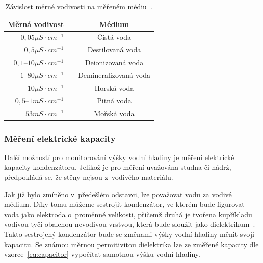             \begin{table}[h]\centering
                \begin{tabular}{@{}rcc@{}}\toprule
                    \textbf{Měrná vodivost}                 && \textbf{Médium}\\
                    \midrule
                    $0,05\unit{\mu S\cdot cm^{-1}}$         && Čistá voda\\
                    $0,5\unit{\mu S\cdot cm^{-1}}$          && Destilovaná voda\\
                    $0,1$--$10\unit{\mu S\cdot cm^{-1}}$    && Deionizovaná voda\\
                    $1$--$80\unit{\mu S\cdot cm^{-1}}$      && Demineralizovaná voda\\
                    $10\unit{\mu S\cdot cm^{-1}}$           && Horská voda\\
                    $0,5$--$1\unit{mS\cdot cm^{-1}}$        && Pitná voda\\
                    $53\unit{mS\cdot cm^{-1}}$              && Mořská voda\\
                    \bottomrule
                \end{tabular}
                \caption{Závislost měrné vodivosti na měřeném médiu~\cite{conductivity}.}
                \label{table:waters}
            \end{table}

        \subsubsection{Měření elektrické kapacity}
            \label{sec:capacitance}

            Další možností pro monitorování výšky vodní hladiny je měření elektrické kapacity kondenzátoru. Jelikož je pro měření uvažována studna či nádrž, předpokládá se, že stěny nejsou z~vodivého materiálu.

            Jak již bylo zmíněno v~předešlém odstavci, lze považovat vodu za vodivé médium. Díky tomu můžeme sestrojit kondenzátor, ve kterém bude figurovat voda jako elektroda o~proměnné velikosti, přičemž druhá je tvořena kupříkladu vodivou tyčí obalenou nevodivou vrstvou, která bude sloužit jako dielektrikum~\cite{dado}. 
            Takto sestrojený kondenzátor bude se změnami výšky vodní hladiny měnit svoji kapacitu. Se známou měrnou permitivitou dielektrika lze ze změřené kapacity dle vzorce~\ref{eq:capacitor} vypočítat samotnou výšku vodní hladiny.  
            
